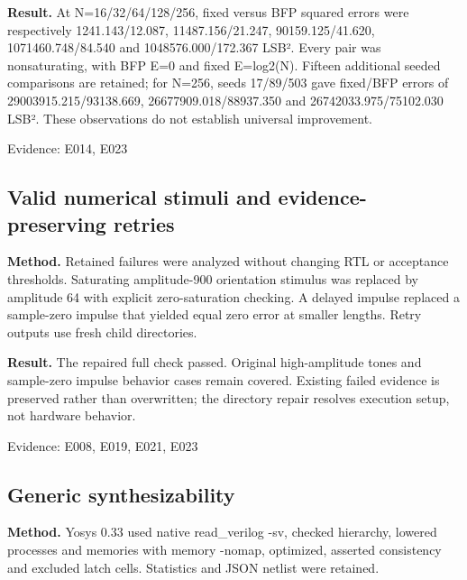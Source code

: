 \documentclass[11pt,a4paper]{article}
\begin{document}
\textbf{Result.} At N=\allowbreak{}16/\allowbreak{}32/\allowbreak{}64/\allowbreak{}128/\allowbreak{}256,\allowbreak{} fixed versus BFP squared errors were respectively 1241.143/\allowbreak{}12.087,\allowbreak{} 11487.156/\allowbreak{}21.247,\allowbreak{} 90159.125/\allowbreak{}41.620,\allowbreak{} 1071460.748/\allowbreak{}84.540 and 1048576.000/\allowbreak{}172.367 LSB². Every pair was nonsaturating,\allowbreak{} with BFP E=\allowbreak{}0 and fixed E=\allowbreak{}log2(\allowbreak{}N)\allowbreak{}. Fifteen additional seeded comparisons are retained; for N=\allowbreak{}256,\allowbreak{} seeds 17/\allowbreak{}89/\allowbreak{}503 gave fixed/\allowbreak{}BFP errors of 29003915.215/\allowbreak{}93138.669,\allowbreak{} 26677909.018/\allowbreak{}88937.350 and 26742033.975/\allowbreak{}75102.030 LSB². These observations do not establish universal improvement.

{\small Evidence: E014,\allowbreak{} E023}

\subsection{Valid numerical stimuli and evidence-preserving retries}

\textbf{Method.} Retained failures were analyzed without changing RTL or acceptance thresholds. Saturating amplitude-900 orientation stimulus was replaced by amplitude 64 with explicit zero-saturation checking. A delayed impulse replaced a sample-zero impulse that yielded equal zero error at smaller lengths. Retry outputs use fresh child directories.

\textbf{Result.} The repaired full check passed. Original high-amplitude tones and sample-zero impulse behavior cases remain covered. Existing failed evidence is preserved rather than overwritten; the directory repair resolves execution setup,\allowbreak{} not hardware behavior.

{\small Evidence: E008,\allowbreak{} E019,\allowbreak{} E021,\allowbreak{} E023}

\subsection{Generic synthesizability}

\textbf{Method.} Yosys 0.33 used native read\_\allowbreak{}verilog -sv,\allowbreak{} checked hierarchy,\allowbreak{} lowered processes and memories with memory -nomap,\allowbreak{} optimized,\allowbreak{} asserted consistency and excluded latch cells. Statistics and JSON netlist were retained.
\end{document}
